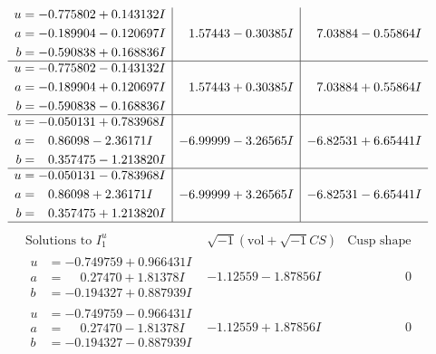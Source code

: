 \documentclass[1p]{elsarticle_modified}
\theoremstyle{definition}
\newcommand{\I}{\sqrt{-1}}
\begin{document}
$$\begin{array}{c|c|c}
\begin{aligned}
u &= -0.775802 + 0.143132 I \\
a &= -0.189904 - 0.120697 I \\
b &= -0.590838 + 0.168836 I\end{aligned}
 & \phantom{-}1.57443 - 0.30385 I & \phantom{-}7.03884 - 0.55864 I \\ \hline\begin{aligned}
u &= -0.775802 - 0.143132 I \\
a &= -0.189904 + 0.120697 I \\
b &= -0.590838 - 0.168836 I\end{aligned}
 & \phantom{-}1.57443 + 0.30385 I & \phantom{-}7.03884 + 0.55864 I \\ \hline\begin{aligned}
u &= -0.050131 + 0.783968 I \\
a &= \phantom{-}0.86098 - 2.36171 I \\
b &= \phantom{-}0.357475 - 1.213820 I\end{aligned}
 & -6.99999 - 3.26565 I & -6.82531 + 6.65441 I \\ \hline\begin{aligned}
u &= -0.050131 - 0.783968 I \\
a &= \phantom{-}0.86098 + 2.36171 I \\
b &= \phantom{-}0.357475 + 1.213820 I\end{aligned}
 & -6.99999 + 3.26565 I & -6.82531 - 6.65441 I\\
 \hline 
 \end{array}$$\newpage$$\begin{array}{c|c|c}  
\text{Solutions to }I^u_{1}& \I (\text{vol} + \sqrt{-1}CS) & \text{Cusp shape}\\
 \hline 
\begin{aligned}
u &= -0.749759 + 0.966431 I \\
a &= \phantom{-}0.27470 + 1.81378 I \\
b &= -0.194327 + 0.887939 I\end{aligned}
 & -1.12559 - 1.87856 I & \phantom{-0.000000 } 0 \\ \hline\begin{aligned}
u &= -0.749759 - 0.966431 I \\
a &= \phantom{-}0.27470 - 1.81378 I \\
b &= -0.194327 - 0.887939 I\end{aligned}
 & -1.12559 + 1.87856 I & \phantom{-0.000000 } 0 \\ \hline\begin{aligned}

\end{aligned}
\end{array}$$
\end{document}
